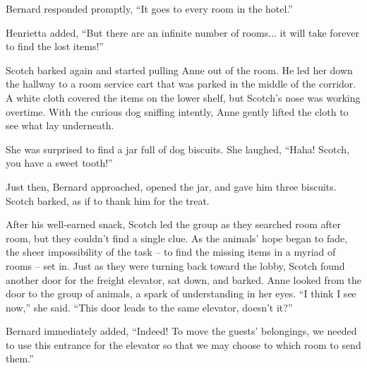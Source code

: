 Bernard responded promptly, ``It goes to every room in the hotel.''

Henrietta added, ``But there are an infinite number of rooms... it will take forever to find the lost items!''

Scotch barked again and started pulling Anne out of the room. He led her down the hallway to a room service cart that was parked in the middle of the corridor. A white cloth covered the items on the lower shelf, but Scotch's nose was working overtime. With the curious dog sniffing intently, Anne gently lifted the cloth to see what lay underneath.

\newpage
She was surprised to find a jar full of dog biscuits. She laughed, ``Haha! Scotch, you have a sweet tooth!''

Just then, Bernard approached, opened the jar, and gave him three biscuits. Scotch barked, as if to thank him for the treat.


After his well-earned snack, Scotch led the group as they searched room after room, but they couldn't find a single clue. As the animals' hope began to fade, the sheer impossibility of the task -- to find the missing items in a myriad of rooms -- set in. Just as they were turning back toward the lobby, Scotch found another door for the freight elevator, sat down, and barked.
Anne looked from the door to the group of animals, a spark of understanding in her eyes. ``I think I see now,'' she said. ``This door leads to the same elevator, doesn't it?''

Bernard immediately added, ``Indeed! To move the guests' belongings, we needed to use this entrance for the elevator so that we may choose to which room to send them.''
\clearpage



\clearpage



